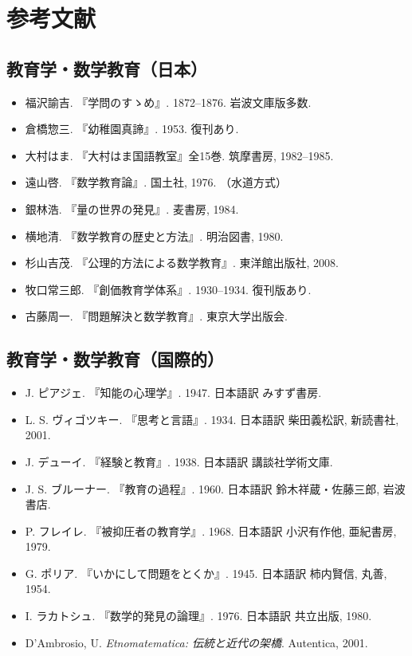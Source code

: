 \documentclass[12pt,a4paper]{scrartcl}
\begin{document}
\section{参考文献}\label{sec:referencias}

\subsection{教育学・数学教育（日本）}
\begin{itemize}[leftmargin=1.3em,itemsep=0.15em,topsep=0.3em]
  \item 福沢諭吉. 『学問のすゝめ』. 1872--1876. 岩波文庫版多数.
  \item 倉橋惣三. 『幼稚園真諦』. 1953. 復刊あり.
  \item 大村はま. 『大村はま国語教室』全15巻. 筑摩書房, 1982--1985.
  \item 遠山啓. 『数学教育論』. 国土社, 1976. （水道方式）
  \item 銀林浩. 『量の世界の発見』. 麦書房, 1984.
  \item 横地清. 『数学教育の歴史と方法』. 明治図書, 1980.
  \item 杉山吉茂. 『公理的方法による数学教育』. 東洋館出版社, 2008.
  \item 牧口常三郎. 『創価教育学体系』. 1930--1934. 復刊版あり.
  \item 古藤周一. 『問題解決と数学教育』. 東京大学出版会.
\end{itemize}

\subsection{教育学・数学教育（国際的）}
\begin{itemize}[leftmargin=1.3em,itemsep=0.15em,topsep=0.3em]
  \item J. ピアジェ. 『知能の心理学』. 1947. 日本語訳 みすず書房.
  \item L. S. ヴィゴツキー. 『思考と言語』. 1934. 日本語訳 柴田義松訳, 新読書社, 2001.
  \item J. デューイ. 『経験と教育』. 1938. 日本語訳 講談社学術文庫.
  \item J. S. ブルーナー. 『教育の過程』. 1960. 日本語訳 鈴木祥蔵・佐藤三郎, 岩波書店.
  \item P. フレイレ. 『被抑圧者の教育学』. 1968. 日本語訳 小沢有作他, 亜紀書房, 1979.
  \item G. ポリア. 『いかにして問題をとくか』. 1945. 日本語訳 柿内賢信, 丸善, 1954.
  \item I. ラカトシュ. 『数学的発見の論理』. 1976. 日本語訳 共立出版, 1980.
  \item D'Ambrosio, U. \emph{Etnomatematica: 伝統と近代の架橋}. Autentica, 2001.
\end{itemize}
\end{document}
